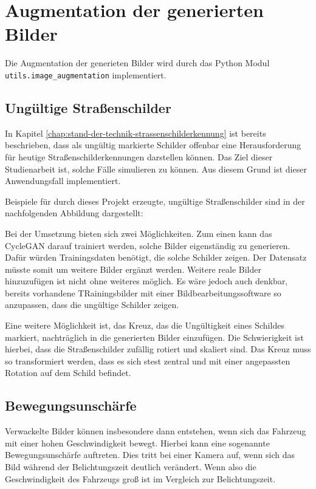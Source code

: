 \chapter{Augmentation der generierten Bilder}
\label{chap:5}
Die Augmentation der generieten Bilder wird durch das Python Modul \lstinline[texcl=false]{utils.image_augmentation} implementiert.
\section{Ungültige Straßenschilder}
In Kapitel \ref{chap:stand-der-technik-strassenschilderkennung} ist bereits beschrieben, dass als ungültig markierte Schilder offenbar eine Herausforderung für heutige Straßenschilderkennungen darstellen können. Das Ziel dieser Studienarbeit ist, solche Fälle simulieren zu können. Aus diesem Grund ist dieser Anwendungsfall implementiert.

Beispiele für durch dieses Projekt erzeugte, ungültige Straßenschilder sind in der nachfolgenden Abbildung dargestellt:

Bei der Umsetzung bieten sich zwei Möglichkeiten. Zum einen kann das \ac{CycleGAN} darauf trainiert werden, solche Bilder eigenständig zu generieren. Dafür würden Trainingsdaten benötigt, die solche Schilder zeigen. Der Datensatz müsste somit um weitere Bilder ergänzt werden. Weitere reale Bilder hinzuzufügen ist nicht ohne weiteres möglich. Es wäre jedoch auch denkbar, bereits vorhandene TRainingsbilder mit einer Bildbearbeitungssoftware so anzupassen, dass die ungültige Schilder zeigen.

Eine weitere Möglichkeit ist, das Kreuz, das die Ungültigkeit eines Schildes markiert, nachträglich in die generierten Bilder einzufügen. Die Schwierigkeit ist hierbei, dass die Straßenschilder zufällig rotiert und skaliert sind. Das Kreuz muss so transformiert werden, dass es sich stest zentral und mit einer angepassten Rotation auf dem Schild befindet.

\section{Bewegungsunschärfe}
Verwackelte Bilder können insbesondere dann entstehen, wenn sich das Fahrzeug mit einer hohen Geschwindigkeit bewegt. Hierbei kann eine sogenannte Bewegungsunschärfe auftreten. Dies tritt bei einer Kamera auf, wenn sich das Bild während der Belichtungszeit deutlich verändert. Wenn also die Geschwindigkeit des Fahrzeugs groß ist im Vergleich zur Belichtungszeit.

